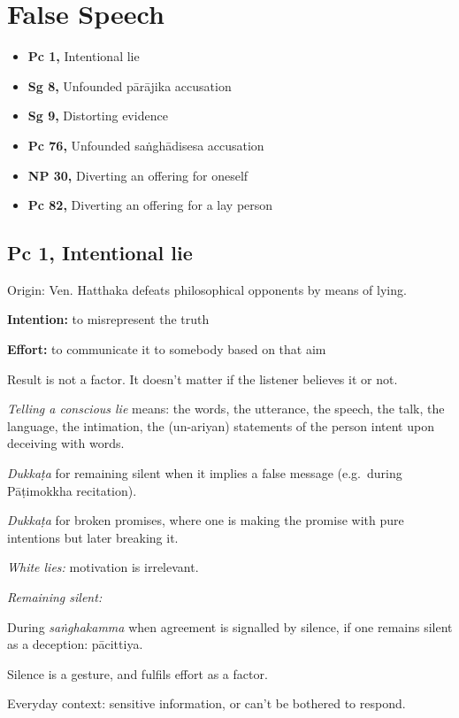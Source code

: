 \chapter{False Speech}

\begin{itemize}
\tightlist
\item
  \textbf{Pc 1,} Intentional lie
\item
  \textbf{Sg 8,} Unfounded pārājika accusation
\item
  \textbf{Sg 9,} Distorting evidence
\item
  \textbf{Pc 76,} Unfounded saṅghādisesa accusation
\item
  \textbf{NP 30,} Diverting an offering for oneself
\item
  \textbf{Pc 82,} Diverting an offering for a lay person
\end{itemize}

\section{Pc 1, Intentional lie}

Origin: Ven. Hatthaka defeats philosophical opponents by means of lying.

\textbf{Intention:} to misrepresent the truth

\textbf{Effort:} to communicate it to somebody based on that aim

Result is not a factor. It doesn't matter if the listener believes it or
not.

\emph{Telling a conscious lie} means: the words, the utterance, the
speech, the talk, the language, the intimation, the (un-ariyan)
statements of the person intent upon deceiving with words.

\emph{Dukkaṭa} for remaining silent when it implies a false message
(e.g.~during Pāṭimokkha recitation).

\emph{Dukkaṭa} for broken promises, where one is making the promise with
pure intentions but later breaking it.

\emph{White lies:} motivation is irrelevant.

\emph{Remaining silent:}

During \emph{saṅghakamma} when agreement is signalled by silence, if one
remains silent as a deception: pācittiya.

Silence is a gesture, and fulfils effort as a factor.

Everyday context: sensitive information, or can't be bothered to
respond.


